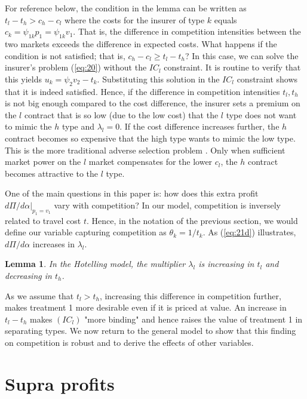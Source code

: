 \documentclass[12pt,english,a4paper]{article}
\newtheorem{lemma}{Lemma}
\begin{document}
For reference below, the condition in the lemma can be written as \(t_l-t_h>c_h-c_l\) where the costs for the insurer of type \(k\) equals \(c_k = \psi_{1k} p_1= \psi_{1k}v_1\). That is, the difference in competition intensities between the two markets exceeds the difference in expected costs. What happens if the condition is not satisfied; that is, \(c_h -c_l \geq t_l-t_h\)? In this case, we can solve the insurer's problem (\ref{eq:20}) without the \(IC_l\) constraint. It is routine to verify that this yields \(u_k = \psi_2 v_2-t_k\). Substituting this solution in the \(IC_l\) constraint shows that it is indeed satisfied. Hence, if the difference in competition intensities \(t_l,t_h\) is not big enough compared to the cost difference, the insurer sets a premium on the \(l\) contract that is so low (due to the low cost) that the \(l\) type does not want to mimic the \(h\) type and \(\lambda_l=0\). If the cost difference increases further, the \(h\) contract becomes so expensive that the high type wants to mimic the low type. This is the more traditional adverse selection problem \citep{rot76}. Only when sufficient market power on the \(l\) market compensates for the lower \(c_l\), the \(h\) contract becomes attractive to the \(l\) type.

One of the main questions in this paper is: how does this extra profit \(d\Pi/d\alpha|_{p_1=v_1}\) vary with competition? In our model, competition is inversely related to travel cost \(t\). Hence, in the notation of the previous section, we would define our variable capturing competition as \(\theta_k = 1/t_k\). As (\ref{eq:21d}) illustrates, \(d\Pi/d\alpha\) increases in \(\lambda_l\).

\begin{lemma} \label{lem:HotTheta}
In the Hotelling model, the multiplier $\lambda_l$ is increasing in $t_l$ and decreasing in $t_h$.
\end{lemma}

As we assume that \(t_l > t_h\), increasing this difference in competition further, makes treatment 1 more desirable even if it is priced at value. An increase in \(t_l-t_h\) makes \((IC_l)\) "more binding" and hence raises the value of treatment 1 in separating types. We now return to the general model to show that this finding on competition is robust and to derive the effects of other variables.

\section{Supra profits}
\label{sec:org79646c5}
\end{document}
